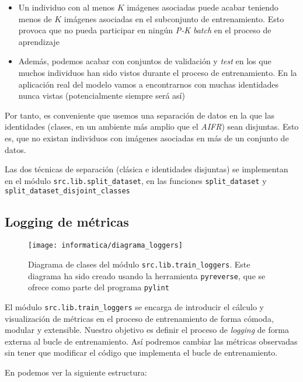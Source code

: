 \begin{itemize}
    \item Un individuo con al menos $K$ imágenes asociadas puede acabar teniendo menos de $K$ imágenes asociadas en el subconjunto de entrenamiento. Esto provoca que no pueda participar en ningún \textit{P-K batch} en el proceso de aprendizaje
    \item Además, podemos acabar con conjuntos de validación y \textit{test} en los que muchos individuos han sido vistos durante el proceso de entrenamiento. En la aplicación real del modelo vamos a encontrarnos con muchas identidades nunca vistas (potencialmente siempre será así)
\end{itemize}

Por tanto, es conveniente que usemos una separación de datos en la que las identidades (clases, en un ambiente más amplio que el \textit{AIFR}) sean disjuntas. Esto es, que no existan individuos con imágenes asociadas en más de un conjunto de datos.

Las dos técnicas de separación (clásica e identidades disjuntas) se implementan en el módulo \lstinline{src.lib.split_dataset}, en las funciones \lstinline{split_dataset} y \lstinline{split_dataset_disjoint_classes}

\subsection{Logging de métricas} \label{isec:loggin_metricas}

\begin{figure}[H]
    \centering
    \texttt{[image: informatica/diagrama\_loggers]}
    \caption{Diagrama de clases del módulo \lstinline{src.lib.train_loggers}. Este diagrama ha sido creado usando la herramienta \lstinline{pyreverse}, que se ofrece como parte del programa \lstinline{pylint}}
    \label{img:diagrama_clases_loggers}
\end{figure}

El módulo \lstinline{src.lib.train_loggers} se encarga de introducir el cálculo y visualización de métricas en el proceso de entrenamiento de forma cómoda, modular y extensible. Nuestro objetivo es definir el proceso de \textit{logging} de forma externa al bucle de entrenamiento. Así podremos cambiar las métricas observadas sin tener que modificar el código que implementa el bucle de entrenamiento.

En  podemos ver la siguiente estructura:

